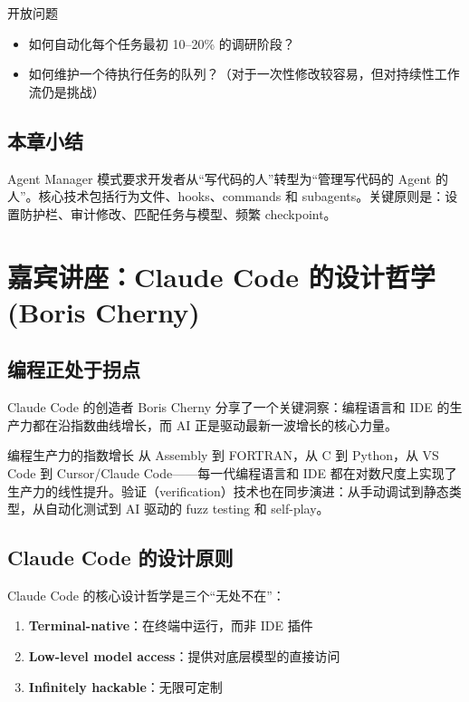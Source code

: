 \documentclass[a4paper]{article}
\begin{document}
\begin{warningbox}{开放问题}
\begin{itemize}
    \item 如何自动化每个任务最初 10--20\% 的调研阶段？
    \item 如何维护一个待执行任务的队列？（对于一次性修改较容易，但对持续性工作流仍是挑战）
\end{itemize}
\end{warningbox}

\subsection{本章小结}

Agent Manager 模式要求开发者从``写代码的人''转型为``管理写代码的 Agent 的人''。核心技术包括行为文件、hooks、commands 和 subagents。关键原则是：设置防护栏、审计修改、匹配任务与模型、频繁 checkpoint。

\section{嘉宾讲座：Claude Code 的设计哲学 (Boris Cherny)}

\subsection{编程正处于拐点}

Claude Code 的创造者 Boris Cherny 分享了一个关键洞察：编程语言和 IDE 的生产力都在沿指数曲线增长，而 AI 正是驱动最新一波增长的核心力量。

\begin{knowledgebox}{编程生产力的指数增长}
从 Assembly 到 FORTRAN，从 C 到 Python，从 VS Code 到 Cursor/Claude Code——每一代编程语言和 IDE 都在对数尺度上实现了生产力的线性提升。验证（verification）技术也在同步演进：从手动调试到静态类型，从自动化测试到 AI 驱动的 fuzz testing 和 self-play。
\end{knowledgebox}

\subsection{Claude Code 的设计原则}

Claude Code 的核心设计哲学是三个``无处不在''：

\begin{enumerate}
    \item \textbf{Terminal-native}：在终端中运行，而非 IDE 插件
    \item \textbf{Low-level model access}：提供对底层模型的直接访问
    \item \textbf{Infinitely hackable}：无限可定制
\end{enumerate}
\end{document}
